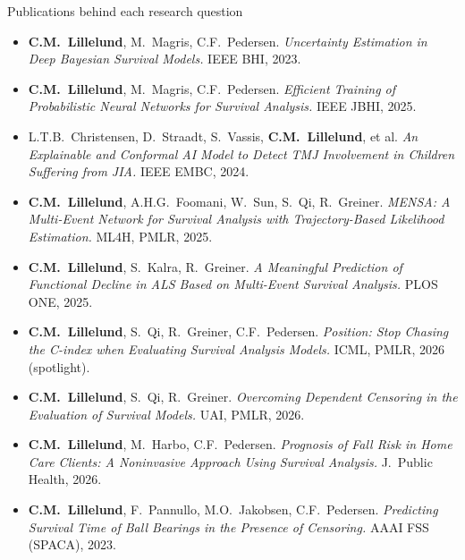\begin{frame}{Publications behind each research question}
\footnotesize
\setlength{\parskip}{0pt}
\newcommand{\me}{\textbf{C.M.~Lillelund}}
\begin{description}[RQ4]\setlength{\itemsep}{0.45em}
  \item[RQ1] \begin{itemize}\setlength{\itemsep}{0.1em}
    \item \me, M.~Magris, C.F.~Pedersen. \emph{Uncertainty Estimation in Deep Bayesian Survival Models.} IEEE BHI, 2023.
    \item \me, M.~Magris, C.F.~Pedersen. \emph{Efficient Training of Probabilistic Neural Networks for Survival Analysis.} IEEE JBHI, 2025.
    \item L.T.B.~Christensen, D.~Straadt, S.~Vassis, \me, et al. \emph{An Explainable and Conformal AI Model to Detect TMJ Involvement in Children Suffering from JIA.} IEEE EMBC, 2024.
  \end{itemize}
  \item[RQ2] \begin{itemize}\setlength{\itemsep}{0.1em}
    \item \me, A.H.G.~Foomani, W.~Sun, S.~Qi, R.~Greiner. \emph{MENSA: A Multi-Event Network for Survival Analysis with Trajectory-Based Likelihood Estimation.} ML4H, PMLR, 2025.
    \item \me, S.~Kalra, R.~Greiner. \emph{A Meaningful Prediction of Functional Decline in ALS Based on Multi-Event Survival Analysis.} PLOS ONE, 2025.
  \end{itemize}
  \item[RQ3] \begin{itemize}\setlength{\itemsep}{0.1em}
    \item \me, S.~Qi, R.~Greiner, C.F.~Pedersen. \emph{Position: Stop Chasing the C-index when Evaluating Survival Analysis Models.} ICML, PMLR, 2026 (spotlight).
    \item \me, S.~Qi, R.~Greiner. \emph{Overcoming Dependent Censoring in the Evaluation of Survival Models.} UAI, PMLR, 2026.
  \end{itemize}
  \item[RQ4] \begin{itemize}\setlength{\itemsep}{0.1em}
    \item \me, M.~Harbo, C.F.~Pedersen. \emph{Prognosis of Fall Risk in Home Care Clients: A Noninvasive Approach Using Survival Analysis.} J.~Public Health, 2026.
    \item \me, F.~Pannullo, M.O.~Jakobsen, C.F.~Pedersen. \emph{Predicting Survival Time of Ball Bearings in the Presence of Censoring.} AAAI FSS (SPACA), 2023.
  \end{itemize}
\end{description}
\end{frame}
